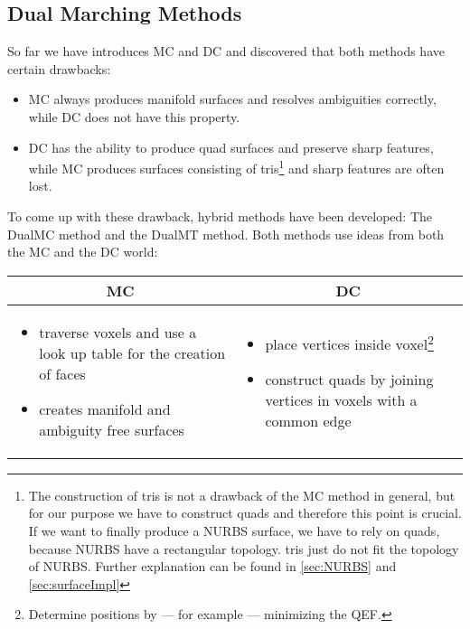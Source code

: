 \subsection{Dual Marching Methods}
So far we have introduces \ac{MC} and \ac{DC} and discovered that both methods have certain drawbacks:
\begin{itemize}
\item \ac{MC} always produces manifold surfaces and resolves ambiguities correctly, while \ac{DC} does not have this property.
\item \ac{DC} has the ability to produce \ac{quad} surfaces and preserve sharp features, while \ac{MC} produces surfaces consisting of \acp{tri}\footnote{The construction of \acp{tri} is not a drawback of the \ac{MC} method in general, but for our purpose we have to construct \acp{quad} and therefore this point is crucial. If we want to finally produce a \ac{NURBS} surface, we have to rely on \acp{quad}, because \ac{NURBS} have a rectangular topology. \Acp{tri} just do not fit the topology of \ac{NURBS}. Further explanation can be found in \autoref{sec:NURBS} and \autoref{sec:surfaceImpl}} and sharp features are often lost.
\end{itemize}
To come up with these drawback, hybrid methods have been developed: The \acf{DualMC} method and the \acf{DualMT} method. Both methods use ideas from both the \ac{MC} and the \ac{DC} world:
\begin{center}
\begin{tabularx}{.9\textwidth}{|X|X|}
\hline
\multicolumn{1}{|c|}{\acl{MC}} 
    & \multicolumn{1}{c|}{\acl{DC}} 
\\
\hline
\begin{itemize}[noitemsep, topsep = 0pt, leftmargin=1em]
\item traverse voxels and use a look up table for the creation of faces
\item creates manifold and ambiguity free surfaces
\end{itemize}
&
\begin{itemize}[noitemsep, topsep = 0pt, leftmargin=1em]
\item place vertices inside voxel\footnote{Determine positions by --- for example --- minimizing the \ac{QEF}.}
\item construct \acp{quad} by joining vertices in voxels with a common edge
\end{itemize}
\\
\hline
\end{tabularx}
\end{center}

